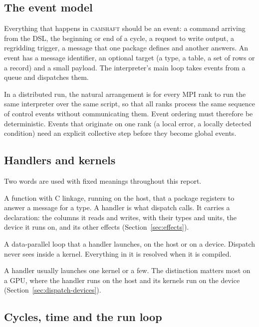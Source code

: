 \documentclass[11pt,a4paper]{article}
\newcommand{\camshaft}{\textsc{camshaft}}
\begin{document}
\subsection{The event model}

Everything that happens in \camshaft{} should be an event: a command arriving
from the DSL, the beginning or end of a cycle, a request to write output,
a regridding trigger, a message that one package defines and another answers.
An event has a message identifier, an optional target (a type, a table, a
set of rows or a record) and a small payload.  The interpreter's main loop takes events
from a queue and dispatches them.

In a distributed run, the natural arrangement is for every MPI rank to run
the same interpreter over the same script, so that all ranks process the same
sequence of control events without communicating them.  Event ordering must
therefore be deterministic.  Events that originate on one rank (a local error,
a locally detected condition) need an explicit collective step before they
become global events.

\subsection{Handlers and kernels}
\label{sec:handlers}

Two words are used with fixed meanings throughout this report.

\begin{description}[style=nextline,leftmargin=2em]
  \item[Handler.]
        A function with C linkage, running on the host, that a package
        registers to answer a message for a type.  A handler is what
        dispatch calls.  It carries a declaration: the columns it reads and
        writes, with their types and units, the device it runs on, and its
        other effects (Section~\ref{sec:effects}).
  \item[Kernel.]
        A data-parallel loop that a handler launches, on the host or on a
        device.  Dispatch never sees inside a kernel.  Everything in it is
        resolved when it is compiled.
\end{description}

A handler usually launches one kernel or a few.  The distinction matters
most on a GPU, where the handler runs on the host and its kernels run on
the device (Section~\ref{sec:dispatch-devices}).

\subsection{Cycles, time and the run loop}
\label{sec:cycles}
\end{document}
